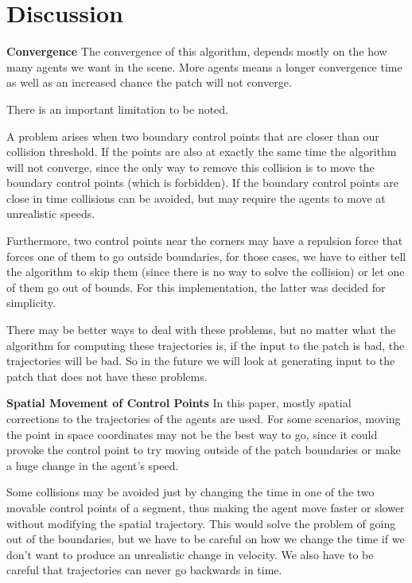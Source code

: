 \section{Discussion}
\label{sec:discussion}

\textbf{Convergence}
The convergence of this algorithm, depends mostly on the how many agents we want in the scene. More agents means a longer convergence time as well as an increased chance the patch will not converge. 

There is an important limitation to be noted. 

A problem arises when two boundary control points that are closer than our collision threshold. If the points are also at exactly the same time the algorithm will not converge, since the only way to remove this collision is to move the boundary control points (which is forbidden). If the boundary control points are close in time collisions can be avoided, but may require the agents to move at unrealistic speeds.

 Furthermore, two control points near the corners may have a repulsion force that forces one of them to go outside boundaries, for those cases, we have to either tell the algorithm to skip them (since there is no way to solve the collision) or let one of them go out of bounds. For this implementation, the latter was decided for simplicity.

There may be better ways to deal with these problems, but no matter what the algorithm for computing these trajectories is, if the input to the patch is bad, the trajectories will be bad. So in the future we will look at generating input to the patch that does not have these problems.

\textbf{ Spatial Movement of Control Points}
In this paper, mostly spatial corrections to the trajectories of the agents are used. For some scenarios, moving the point in space coordinates may not be the best way to go, since it could provoke the control point to try moving outside of the patch boundaries or make a huge change in the agent's speed.   

Some collisions may be avoided just by changing the time in one of the two movable control points of a segment, thus making the agent move faster or slower without modifying the spatial trajectory. This would solve the problem of going out of the boundaries, but we have to be careful on how we change the time if we don't want to produce an unrealistic change in velocity.  We also have to be careful that trajectories can never go backwards in time. 


